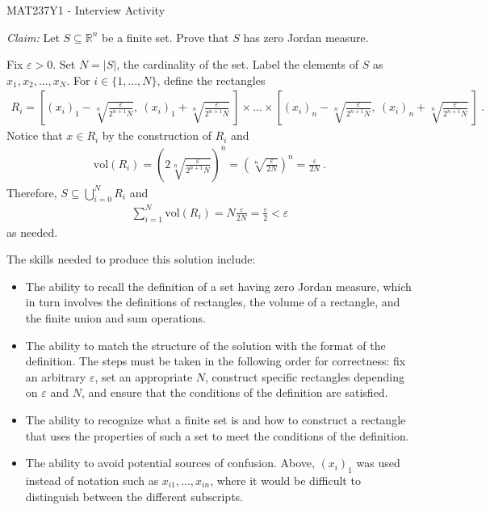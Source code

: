 \documentclass[answers]{exam}
\begin{document}
\begin{center}
{\Large MAT237Y1 - Interview Activity}
\end{center}

\begin{questions}

\question \textit{Claim:} Let $S\subseteq\mathbb{R}^n$ be a finite set. Prove that $S$ has zero Jordan measure.

\begin{solution}
Fix $\varepsilon > 0$. Set $N = |S|$, the cardinality of the set. Label the elements of $S$ as $x_1,x_2,...,x_N$. For $i\in\{1,...,N\}$, define the rectangles\begin{align*}
    R_i = \left[(x_i)_1-\sqrt[n]{\frac{\varepsilon}{2^{n+1} N}},\ (x_i)_1+\sqrt[n]{\frac{\varepsilon}{2^{n+1} N}}\ \right]\times...\times\left[(x_i)_n-\sqrt[n]{\frac{\varepsilon}{2^{n+1} N}},\ (x_i)_n+\sqrt[n]{\frac{\varepsilon}{2^{n+1} N}}\ \right]\ .
\end{align*} Notice that $x\in R_i$ by the construction of $R_i$ and\begin{align*}
    \text{vol}(R_i)=(2\sqrt[n]{\frac{\varepsilon}{2^{n+1} N}})^n=(\sqrt[n]{\frac{\varepsilon}{2N}})^n=\frac{\varepsilon}{2N}\ .
\end{align*}Therefore, $S\subseteq\bigcup_{i=0}^N R_i$ and\begin{align*}
    \sum_{i=1}^N \text{vol}(R_i)=N\frac{\varepsilon}{2N}=\frac{\varepsilon}{2}<\varepsilon
\end{align*}as needed.
\end{solution}

\end{questions}

The skills needed to produce this solution include:\begin{itemize}
    \item The ability to recall the definition of a set having zero Jordan measure, which in turn involves the definitions of rectangles, the volume of a rectangle, and the finite union and sum operations.
    \item The ability to match the structure of the solution with the format of the definition. The steps must be taken in the following order for correctness: fix an arbitrary $\varepsilon$, set an appropriate $N$, construct specific rectangles depending on $\varepsilon$ and $N$, and ensure that the conditions of the definition are satisfied.
    \item The ability to recognize what a finite set is and how to construct a rectangle that uses the properties of such a set to meet the conditions of the definition.
    \item The ability to avoid potential sources of confusion. Above, $(x_i)_1$ was used instead of notation such as $x_{i1},\ldots,x_{in}$, where it would be difficult to distinguish between the different subscripts.
\end{itemize}
\end{document}
